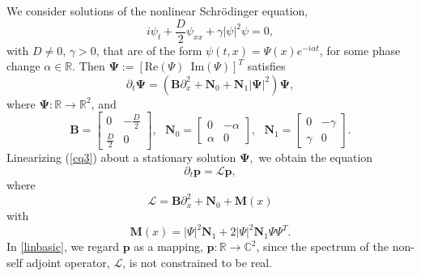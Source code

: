 \documentclass{birkjour}
\theoremstyle{definition}
\theoremstyle{remark}
\numberwithin{equation}{section}
\begin{document}
We consider solutions of the nonlinear Schr\"odinger equation,
\begin{equation}
i\psi_t + \frac D2 \psi_{xx} + \gamma |\psi |^2 \psi = 0,
\end{equation} 
with $D\neq 0$, $\gamma > 0$, 
 that are of the form
   $ \psi(t,x) = \Psi(x)e^{-i \alpha t}$,
for some phase change $\alpha\in \mathbb R$. Then $\boldsymbol{\Psi} := [\text{Re}({\Psi}) \,\,\, \text{Im}({\Psi})]^T$
satisfies 
\begin{equation}\label{cq3}
    \partial_t \boldsymbol{\Psi} = \left( \mathbf{B}\partial_x^2 + \mathbf{N}_0 + \mathbf{N}_1|\boldsymbol{\Psi}|^2 \right) \boldsymbol{\Psi},
\end{equation}
where $\boldsymbol{\Psi} : \mathbb R \to \mathbb R^2$, and
\begin{equation}
    \mathbf{B} = 
    \begin{bmatrix}
    0 & -\frac{D}{2}\\
    \frac{D}{2} & 0
    \end{bmatrix},
    \,\,\,\,
\mathbf{N}_0 = 
\begin{bmatrix}
0 & -\alpha\\ \alpha & 0
\end{bmatrix},
 \,\,\,\,
\mathbf{N}_1 = 
\begin{bmatrix}
0 & -\gamma\\ \gamma & 0
\end{bmatrix}.
\end{equation}
Linearizing (\ref{cq3}) about a stationary solution $\boldsymbol{\Psi},$ we obtain the equation 
\begin{equation}\label{linbasic}
    \partial_t \mathbf{p} = \mathcal{L}\mathbf{p},
\end{equation}
where  
\begin{equation}\label{operatorL}
    \mathcal{L}= \mathbf{B}\partial_x^2 +  \mathbf{N}_0 +  {\mathbf{M}}(x) 
\end{equation}
with
\begin{equation}\label{MTilde}
   \mathbf{M}(x) = |\Psi|^2\mathbf{N}_1  +  2 |\Psi|^2 \mathbf{N}_1\Psi \Psi^T.
\end{equation}
In  \eqref{linbasic}, we regard $\mathbf p$ as a mapping, $\mathbf {p} : \mathbb R \to \mathbb C^2$, since the spectrum of the non-self adjoint operator, $\mathcal L$, is not constrained to be real.  
\end{document}
